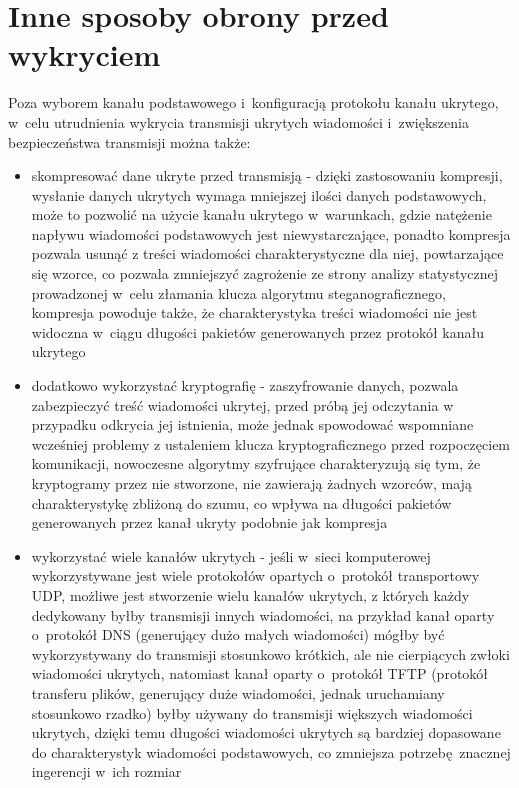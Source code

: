 \documentclass[a4paper, twoside, 12pt]{report}
\begin{document}
    \section{Inne sposoby obrony przed wykryciem}
       Poza wyborem kanału podstawowego i~konfiguracją protokołu kanału ukrytego,
       w~celu utrudnienia wykrycia transmisji ukrytych wiadomości i~zwiększenia
       bezpieczeństwa transmisji można także:
       \begin{itemize}
           \item skompresować dane ukryte przed transmisją - dzięki zastosowaniu
               kompresji, wysłanie danych ukrytych wymaga mniejszej ilości
               danych podstawowych, może to pozwolić na użycie kanału ukrytego
               w~warunkach, gdzie natężenie napływu wiadomości podstawowych
               jest niewystarczające, ponadto kompresja pozwala usunąć z treści
               wiadomości charakterystyczne dla niej, powtarzające się wzorce,
               co pozwala zmniejszyć zagrożenie ze strony analizy statystycznej
               prowadzonej w~celu złamania klucza algorytmu steganograficznego,
               kompresja powoduje także, że charakterystyka treści wiadomości nie jest widoczna
               w~ciągu długości pakietów generowanych przez protokół kanału ukrytego
           \item dodatkowo wykorzystać kryptografię - zaszyfrowanie danych, pozwala
               zabezpieczyć treść wiadomości ukrytej, przed próbą jej odczytania w
               przypadku odkrycia jej istnienia, może jednak spowodować wspomniane
               wcześniej problemy z ustaleniem klucza kryptograficznego przed rozpoczęciem
               komunikacji, nowoczesne algorytmy szyfrujące charakteryzują się
               tym, że kryptogramy przez nie stworzone, nie zawierają żadnych wzorców,
               mają charakterystykę zbliżoną do szumu, co wpływa na długości pakietów
               generowanych przez kanał ukryty podobnie jak kompresja
           \item wykorzystać wiele kanałów ukrytych - jeśli w~sieci komputerowej
               wykorzystywane jest wiele protokołów opartych o~protokół transportowy UDP,
               możliwe jest stworzenie wielu kanałów ukrytych, z których każdy dedykowany
               byłby transmisji innych wiadomości, na przykład kanał oparty o~protokół
               DNS (generujący dużo małych wiadomości)  mógłby być wykorzystywany
               do transmisji stosunkowo krótkich, ale nie cierpiących zwłoki wiadomości
               ukrytych, natomiast kanał oparty o~protokół TFTP (protokół transferu plików,
               generujący duże wiadomości, jednak uruchamiany stosunkowo rzadko)
               byłby używany do transmisji większych wiadomości ukrytych, dzięki
               temu długości wiadomości ukrytych są bardziej dopasowane do charakterystyk
               wiadomości podstawowych, co zmniejsza potrzebę znacznej ingerencji
               w~ich rozmiar


\end{itemize}
\end{document}
